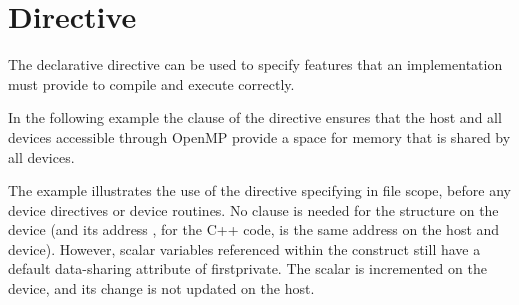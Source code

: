 \pagebreak
\section{ Directive}
\label{sec:requires}

The declarative  directive can be used to 
specify features that an implementation must provide to compile and 
execute correctly.

In the following example the  clause 
of the  directive ensures that the host and all 
devices accessible through OpenMP provide a  space
for memory that is shared by all devices.

The example illustrates the use of the  directive specifying
 in file scope, before any device 
directives or device routines. No  clause is needed for
the  structure on the device (and its address , for the C++ code,
is the same address on the host and device).
However, scalar variables referenced within the 
construct still have a default data-sharing attribute of firstprivate.
The  scalar is incremented on the device, and its change is
not updated on the host.



